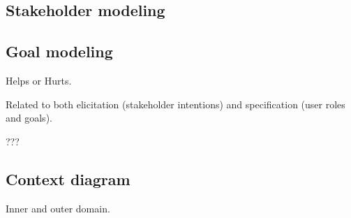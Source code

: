 \subsection{Stakeholder modeling}

\subsection{Goal modeling}

Helps or Hurts.

Related to both elicitation (stakeholder intentions) and specification (user roles and goals).

???

\subsection{Context diagram}

Inner and outer domain.






